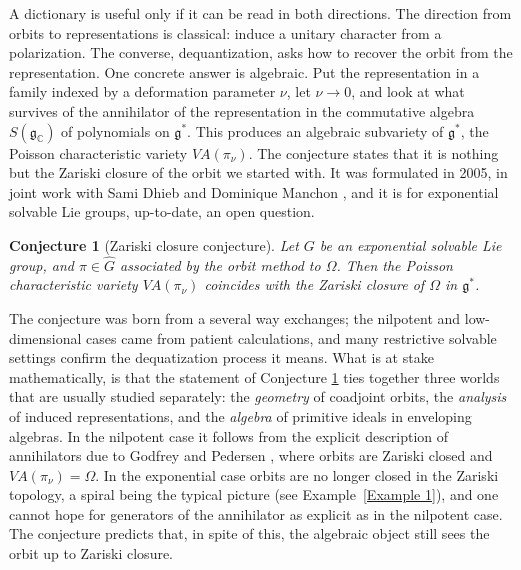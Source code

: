\documentclass[11pt]{amsart}
\theoremstyle{plain}
\newtheorem{con}[thm]{Conjecture}
\theoremstyle{definition}
\theoremstyle{remark}
\newcommand{\g}{\mathfrak g}
\newcommand{\CC}{\mathbb C}
\newcommand{\VA}{V\!A}
\begin{document}
	A dictionary is useful only if it can be read in both directions. The direction from orbits to representations is classical: induce a unitary character from a polarization. The converse, {dequantization}, asks how to recover the orbit from the representation. One concrete answer is algebraic. Put the representation in a family indexed by a deformation parameter $\nu$, let $\nu\to 0$, and look at what survives of the annihilator of the representation in the commutative algebra $S(\g_{\CC})$ of polynomials on $\g^*$. This produces an algebraic subvariety of $\g^*$, the {Poisson characteristic variety} $\VA(\pi_\nu)$. The conjecture states that it is nothing but the Zariski closure of the orbit we started with.   It was formulated in 2005, in joint work with Sami Dhieb and Dominique Manchon \cite{BDM05}, and it is for exponential solvable Lie groups, up-to-date, an open question.\\
	
	
	\begin{con}[Zariski closure conjecture]\label{C}
		Let $G$ be an exponential solvable Lie group, and $\pi\in\widehat G$ associated by the orbit method to $\Omega$. Then the Poisson characteristic variety $\VA(\pi_\nu)$ coincides with the Zariski closure of $\Omega$ in $\g^*$.
		
	\end{con}
	
 
	The conjecture was born from a several way exchanges; the nilpotent and low-dimensional cases came from patient calculations, and many restrictive solvable settings confirm the dequatization process it means.
	What is at stake mathematically, 
	is that the statement of  Conjecture \ref{C} ties together three worlds that are usually studied separately: the \emph{geometry} of coadjoint orbits, the \emph{analysis} of induced representations, and the \emph{algebra} of primitive ideals in enveloping algebras. In the nilpotent case it follows from the explicit description of annihilators due to Godfrey and Pedersen \cite{Go,Pe84}, where orbits are Zariski closed and $\VA(\pi_\nu)=\Omega$. In the exponential case orbits are no longer closed in the Zariski topology, a spiral being the typical picture (see Example~\ref{Example 1}), and one cannot hope for generators of the annihilator as explicit as in the nilpotent case. The conjecture predicts that, in spite of this, the algebraic object still sees the orbit up to Zariski closure.
	
\end{document}
